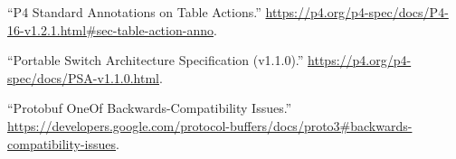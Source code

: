 \documentclass[11pt]{article}
\begin{document}
{{\begin{thebibliography}{39}
\mdbibitemlabel{{}[18]}\textquotedblleft{}P4 Standard Annotations on Table Actions.\textquotedblright{} \href{https://p4.org/p4-spec/docs/P4-16-v1.2.1.html\%23sec-table-action-anno}{{\ttfamily https://\hspace{0pt}p4.\hspace{0pt}org/\hspace{0pt}p4-\hspace{0pt}spec/\hspace{0pt}docs/\hspace{0pt}P4-\hspace{0pt}16-\hspace{0pt}v1.\hspace{0pt}2.\hspace{0pt}1.\hspace{0pt}html\#\hspace{0pt}sec-\hspace{0pt}table-\hspace{0pt}action-\hspace{0pt}anno}}.\label{p4actionannotations}%

\mdbibitemlabel{{}[19]}\textquotedblleft{}Portable Switch Architecture Specification (v1.1.0).\textquotedblright{} \href{https://p4.org/p4-spec/docs/PSA-v1.1.0.html}{{\ttfamily https://\hspace{0pt}p4.\hspace{0pt}org/\hspace{0pt}p4-\hspace{0pt}spec/\hspace{0pt}docs/\hspace{0pt}PSA-\hspace{0pt}v1.\hspace{0pt}1.\hspace{0pt}0.\hspace{0pt}html}}.\label{psa}%

\mdbibitemlabel{{}[20]}\textquotedblleft{}Protobuf OneOf Backwards-Compatibility Issues.\textquotedblright{} \href{https://developers.google.com/protocol-buffers/docs/proto3\%23backwards-compatibility-issues}{{\ttfamily https://\hspace{0pt}developers.\hspace{0pt}google.\hspace{0pt}com/\hspace{0pt}protocol-\hspace{0pt}buffers/\hspace{0pt}docs/\hspace{0pt}proto3\#\hspace{0pt}backwards-\hspace{0pt}compatibility-\hspace{0pt}issues}}.\label{protooneofbackwardscompatibility}%


\end{thebibliography}}}
\end{document}
